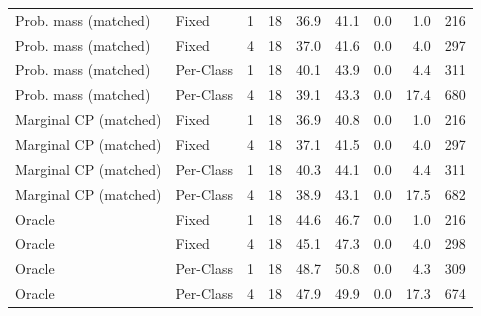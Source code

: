 \begin{tabular}{llrrrrrrr}
Prob. mass (matched) & Fixed & 1 & 18 & 36.9 & 41.1 & 0.0 & 1.0 & 216 \\
Prob. mass (matched) & Fixed & 4 & 18 & 37.0 & 41.6 & 0.0 & 4.0 & 297 \\
Prob. mass (matched) & Per-Class & 1 & 18 & 40.1 & 43.9 & 0.0 & 4.4 & 311 \\
Prob. mass (matched) & Per-Class & 4 & 18 & 39.1 & 43.3 & 0.0 & 17.4 & 680 \\
Marginal CP (matched) & Fixed & 1 & 18 & 36.9 & 40.8 & 0.0 & 1.0 & 216 \\
Marginal CP (matched) & Fixed & 4 & 18 & 37.1 & 41.5 & 0.0 & 4.0 & 297 \\
Marginal CP (matched) & Per-Class & 1 & 18 & 40.3 & 44.1 & 0.0 & 4.4 & 311 \\
Marginal CP (matched) & Per-Class & 4 & 18 & 38.9 & 43.1 & 0.0 & 17.5 & 682 \\
Oracle & Fixed & 1 & 18 & 44.6 & 46.7 & 0.0 & 1.0 & 216 \\
Oracle & Fixed & 4 & 18 & 45.1 & 47.3 & 0.0 & 4.0 & 298 \\
Oracle & Per-Class & 1 & 18 & 48.7 & 50.8 & 0.0 & 4.3 & 309 \\
Oracle & Per-Class & 4 & 18 & 47.9 & 49.9 & 0.0 & 17.3 & 674 \\
\bottomrule
\end{tabular}
